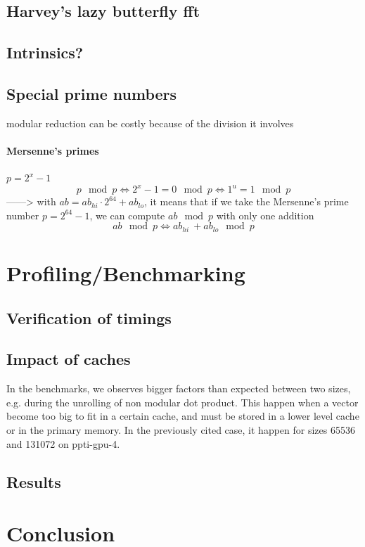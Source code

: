 \documentclass[a4paper]{article}
\begin{document}
\subsection{Harvey's lazy butterfly fft}




\subsection{Intrinsics?}


\subsection{Special prime numbers}

modular reduction can be costly because of the division it involves

\paragraph{Mersenne's primes}

$p = 2^x - 1$
\[
p \mod p \Longleftrightarrow 2^x - 1 = 0 \mod p \Longleftrightarrow 1^u = 1 \mod p
\]
------> with $ab = ab_{hi}\cdot 2^{64} + ab_{lo}$, it means that if we take the Mersenne's prime number $p = 2^{64} - 1$, we can compute $ab \mod p$ with only one addition 
\[
    ab \mod p \Longleftrightarrow ab_{hi}\ + ab_{lo} \mod p
\]


\section{Profiling/Benchmarking}

\subsection{Verification of timings}

\subsection{Impact of caches} %

In the benchmarks, we observes bigger factors than expected between two sizes,
e.g. during the unrolling of non modular dot product. This happen when a vector
become too big to fit in a certain cache, and must be stored in a lower level
cache or in the primary memory. In the previously cited case, it happen for sizes
65536 and 131072 on ppti-gpu-4. %


\subsection{Results}

\section{Conclusion}



\newpage
 
 
\nocite{*}
\end{document}
